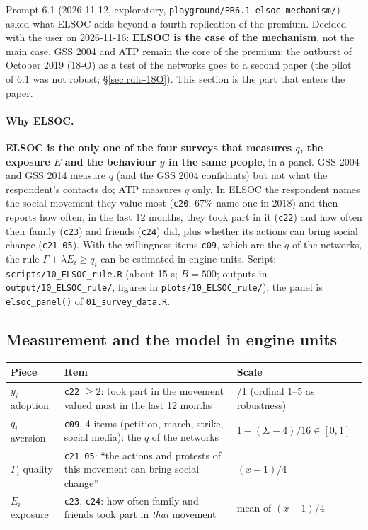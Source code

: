 \documentclass[11pt,a4paper]{article}
\newcommand{\code}[1]{\texttt{#1}}
\begin{document}
Prompt 6.1 (2026-11-12, exploratory, \code{playground/PR6.1-elsoc-mechanism/}) asked what ELSOC adds
beyond a fourth replication of the premium. Decided with the user on 2026-11-16: \textbf{ELSOC is the
case of the mechanism}, not the main case. GSS 2004 and ATP remain the core of the premium; the
outburst of October 2019 (18-O) as a test of the networks goes to a second paper (the pilot of 6.1 was not
robust; \S\ref{sec:rule-18O}). This section is the part that enters the paper.

\paragraph{Why ELSOC.} \textbf{ELSOC is the only one of the four surveys that measures $q$, the exposure
$E$ and the behaviour $y$ in the same people}, in a panel. GSS 2004 and GSS 2014 measure $q$ (and the GSS
2004 confidants) but not what the respondent's contacts do; ATP measures $q$ only. In ELSOC the
respondent names the social movement they value most (\code{c20}; 67\% name one in 2018) and then reports
how often, in the last 12 months, they took part in it (\code{c22}) and how often their family
(\code{c23}) and friends (\code{c24}) did, plus whether its actions can bring social change
(\code{c21\_05}). With the willingness items \code{c09}, which are the $q$ of the networks, the rule
$\Gamma + \lambda E_i \ge q_i$ can be estimated in engine units. Script:
\code{scripts/10\_ELSOC\_rule.R} (about 15 s; $B = 500$; outputs in \code{output/10\_ELSOC\_rule/},
figures in \code{plots/10\_ELSOC\_rule/}); the panel is \code{elsoc\_panel()} of \code{01\_survey\_data.R}.

\subsection{Measurement and the model in engine units}
\label{sec:rule-model}

\begin{center}
\small
\begin{tabularx}{\textwidth}{@{}l>{\raggedright\arraybackslash}X>{\raggedright\arraybackslash}p{4.4cm}@{}}
\toprule
Piece & Item & Scale \\
\midrule
$y_i$ adoption & \code{c22} $\ge 2$: took part in the movement valued most in the last 12 months & 0/1 (ordinal 1--5 as robustness) \\
$q_i$ aversion & \code{c09}, 4 items (petition, march, strike, social media): the $q$ of the networks & $1 - (\Sigma - 4)/16 \in [0, 1]$ \\
$\Gamma_i$ quality & \code{c21\_05}: ``the actions and protests of this movement can bring social change'' & $(x - 1)/4$ \\
$E_i$ exposure & \code{c23}, \code{c24}: how often family and friends took part in \emph{that} movement & mean of $(x - 1)/4$ \\
\bottomrule
\end{tabularx}
\end{center}
\end{document}
